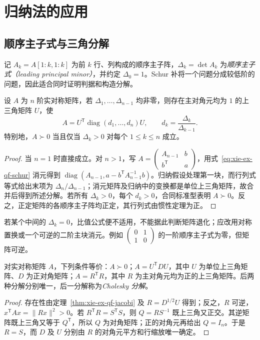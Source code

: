\section{归纳法的应用}
\label{sec:xie-ex-qf-induction}

\subsection{顺序主子式与三角分解}

记 $A_k=A[1\!:\!k,1\!:\!k]$ 为前 $k$ 行、列构成的顺序主子阵，$\Delta_k=\det A_k$ 为\emph{顺序主子式（leading principal minor）}，并约定 $\Delta_0=1$。Schur 补将一个问题分成较低阶的问题，因此适合同时证明判据和构造分解。

\begin{theorem}
\label{thm:xie-ex-qf-jacobi}
设 $A$ 为 $n$ 阶实对称矩阵，若 $\Delta_1,\ldots,\Delta_{n-1}$ 均非零，则存在主对角元均为 $1$ 的上三角矩阵 $U$，使
\begin{equation}
 A=U^{\mathsf T}\operatorname{diag}(d_1,\ldots,d_n)U,
 \qquad d_k=\frac{\Delta_k}{\Delta_{k-1}}.
 \label{eq:xie-ex-qf-jacobi}
\end{equation}
特别地，$A\succ0$ 当且仅当 $\Delta_k>0$ 对每个 $1\le k\le n$ 成立。
\end{theorem}
\begin{proof}
当 $n=1$ 时直接成立。对 $n>1$，写 $A=\begin{pmatrix}A_{n-1}&b\\b^{\mathsf T}&a\end{pmatrix}$，用式~\eqref{eq:xie-ex-qf-schur} 消元得到 $\operatorname{diag}(A_{n-1},a-b^{\mathsf T}A_{n-1}^{-1}b)$。归纳假设处理第一块，而行列式等式给出末项为 $\Delta_n/\Delta_{n-1}$；消元矩阵及归纳中的变换都是单位上三角矩阵，故合并后得到所述分解。若所有 $\Delta_k>0$，每个 $d_k>0$，合同标准型表明 $A\succ0$。反之，正定矩阵的各顺序主子阵均正定，其行列式由惯性定理为正。
\end{proof}

若某个中间的 $\Delta_k=0$，比值公式便不适用，不能据此判断矩阵退化；应改用对称置换或一个可逆的二阶主块消元。例如 $\begin{pmatrix}0&1\\1&0\end{pmatrix}$ 的一阶顺序主子式为零，但矩阵可逆。

\begin{theorem}
\label{thm:xie-ex-qf-cholesky}
对实对称矩阵 $A$，下列条件等价：$A\succ0$；$A=U^{\mathsf T}DU$，其中 $U$ 为单位上三角矩阵、$D$ 为正对角矩阵；$A=R^{\mathsf T}R$，其中 $R$ 为主对角元均为正的上三角矩阵。后两种分解分别唯一，后一分解称为\emph{Cholesky 分解}。
\end{theorem}
\begin{proof}
存在性由定理~\ref{thm:xie-ex-qf-jacobi} 及 $R=D^{1/2}U$ 得到；反之，$R$ 可逆，$x^{\mathsf T}Ax=\|Rx\|^2>0$。若 $R^{\mathsf T}R=S^{\mathsf T}S$，则 $Q=RS^{-1}$ 既上三角又正交。其逆矩阵既上三角又等于 $Q^{\mathsf T}$，所以 $Q$ 为对角矩阵；正的对角元再给出 $Q=I_n$。于是 $R=S$，而 $D$ 及 $U$ 分别由 $R$ 的对角元平方和行缩放唯一确定。
\end{proof}

